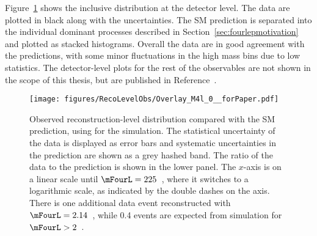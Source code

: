 Figure~\ref{fig:recoresults1} shows the inclusive \mFourL{} distribution at the detector level. The data are plotted in black along with the uncertainties. The SM prediction is separated into the individual dominant processes described in Section~\ref{sec:fourlepmotivation} and plotted as stacked histograms. 
Overall the data are in good agreement with the predictions, with some minor fluctuations in the high mass bins due to low statistics. The detector-level plots for the rest of the observables are not shown in the scope of this thesis, but are published in Reference~\cite{m4l2021_paper}. 
\begin{figure}[htb]
\centering
 \texttt{[image: figures/RecoLevelObs/Overlay\_M4l\_0\_\_forPaper.pdf]}
    \caption{Observed reconstruction-level \mFourL{} distribution compared with the SM prediction, using
      \SHERPA{} for the \qqFourL{} simulation.
     The statistical uncertainty of the
      data is displayed as error bars and systematic uncertainties
      in the prediction are shown as a grey hashed band.  The
      ratio of the data to the prediction is shown in the lower
      panel.  The $x$-axis is on a linear scale until $\mFourL = 225$~\GeV,
where it switches to a logarithmic scale, as indicated by the double
dashes on the axis.
      There is one additional data event reconstructed with 
$\mFourL = 2.14$~\TeV, while 0.4 events are expected from simulation for
$\mFourL > 2$~\TeV. \label{fig:recoresults1}}
\end{figure}
